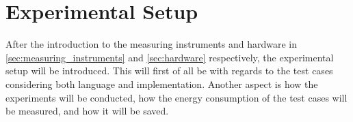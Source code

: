 \section{Experimental Setup}\label{sec:experimental_setup}

After the introduction to the measuring instruments and hardware in \cref{sec:measuring_instruments} and \cref{sec:hardware} respectively, the experimental setup will be introduced. This will first of all be with regards to the test cases considering both language and implementation. Another aspect is how the experiments will be conducted, how the energy consumption of the test cases will be measured, and how it will be saved. 





